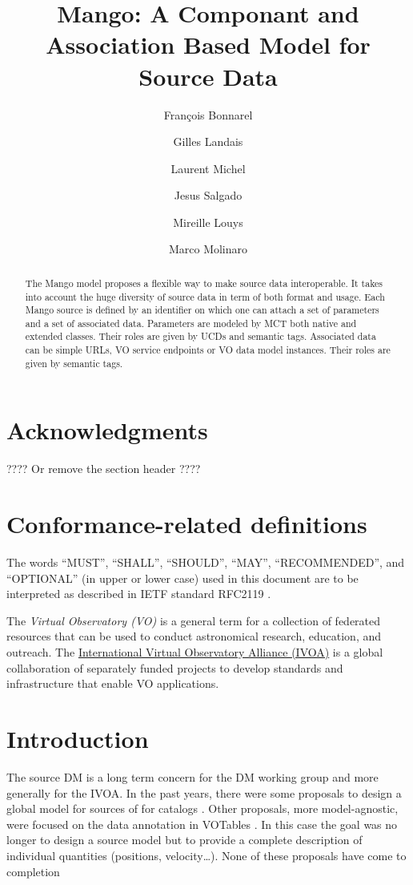 \documentclass[11pt,a4paper]{ivoa}
\title{Mango: A Componant and Association Based Model for Source Data}
\author{François Bonnarel}
\author{Gilles Landais}
\author{Laurent Michel}
\author{Jesus Salgado}
\author{Mireille Louys}
\author{Marco Molinaro}
\begin{document}
\begin{abstract}
The Mango model proposes a flexible way to make source data interoperable. It takes into account the huge diversity of source data in term of both format and usage. 
Each Mango source is defined by an identifier on which  one can attach a set of parameters and a set of associated data. Parameters are modeled by  MCT both native and extended classes. Their roles are given by UCDs and semantic tags.
Associated data can be simple URLs, VO service endpoints or VO data model instances. Their roles are given by semantic tags.

\end{abstract}


\section*{Acknowledgments}

???? Or remove the section header ????

\section*{Conformance-related definitions}

The words ``MUST'', ``SHALL'', ``SHOULD'', ``MAY'', ``RECOMMENDED'', and
``OPTIONAL'' (in upper or lower case) used in this document are to be
interpreted as described in IETF standard RFC2119 \citep{std:RFC2119}.

The \emph{Virtual Observatory (VO)} is a
general term for a collection of federated resources that can be used
to conduct astronomical research, education, and outreach.
The \href{http://www.ivoa.net}{International
Virtual Observatory Alliance (IVOA)} is a global
collaboration of separately funded projects to develop standards and
infrastructure that enable VO applications.


\section{Introduction}

The source DM is a long term concern for the DM working group and more generally for the IVOA.
In the past years, there were some proposals to design a global model for sources \citep{wd:jesusdm} of for catalogs \citep{wd:catalog}.
Other proposals, more model-agnostic, were focused on the data annotation in VOTables \citep{note:stcvot} \citep{note:seb}. In this case the goal was no longer to design a source model but to provide a complete description of  individual quantities (positions, velocity…).
None of these proposals have come to completion
\end{document}
